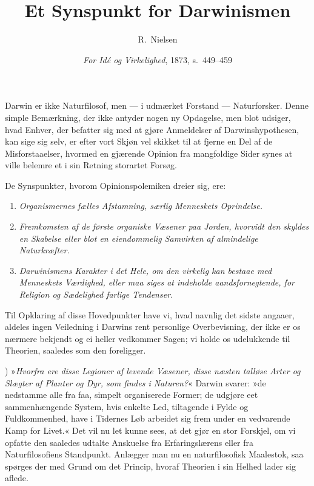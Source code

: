 \documentclass[12pt,a4paper]{article}
\title{\textbf{Et Synspunkt for Darwinismen}}
\author{R.\ Nielsen}
\date{\emph{For Idé og Virkelighed}, 1873, s.\ 449--459}
\newcommand{\apage}[1]{\marginnote{\footnotesize\textit{[#1]}}}
\begin{document}
\maketitle
\thispagestyle{fancy} \apage{449}

\bigskip

\noindent Darwin er ikke Naturfilosof, men --- i udmærket Forstand ---
Naturforsker. Denne simple Bemærkning, der ikke antyder nogen ny
Opdagelse, men blot udsiger, hvad Enhver, der befatter sig med at
gjøre Anmeldelser af Darwinshypothesen, kan sige sig selv, er efter
vort Skjøn vel skikket til at fjerne en Del af de Misforstaaelser,
hvormed en gjærende Opinion fra mangfoldige Sider synes at ville
belemre et i sin Retning storartet Forsøg.

De Synspunkter, hvorom Opinionspolemiken dreier sig, ere:

\begin{enumerate}
  \item \emph{Organismernes fælles Afstamning, særlig Menneskets Oprindelse.}
  \item \emph{Fremkomsten af de første organiske Væsener paa Jorden,
        hvorvidt den skyldes en Skabelse eller blot en eiendommelig
        Samvirken af almindelige Naturkræfter.}
  \item \emph{Darwinismens Karakter i det Hele, om den virkelig kan bestaae
        med Menneskets Værdighed, eller maa siges at indeholde
        \apage{450}aandsfornegtende, for Religion og Sædelighed farlige Tendenser.}
\end{enumerate}

\noindent Til Opklaring af disse Hovedpunkter have vi, hvad navnlig
det sidste angaaer, aldeles ingen Veiledning i Darwins rent personlige
Overbevisning, der ikke er os nærmere bekjendt og ei heller vedkommer
Sagen; vi holde os udelukkende til Theorien, saaledes som den
foreligger.


\medskip

) »\emph{Hvorfra ere disse Legioner af levende Væsener, disse næsten
talløse Arter og Slægter af Planter og Dyr, som findes i Naturen?}«
Darwin svarer: »de nedstamme alle fra faa, simpelt organiserede Former;
de udgjøre eet sammenhængende System, hvis enkelte Led, tiltagende i
Fylde og Fuldkommenhed, have i Tidernes Løb arbeidet sig frem under en
vedvarende Kamp for Livet.« Det vil nu let kunne sees, at det gjør en stor Forskjel, om vi opfatte
den saaledes udtalte Anskuelse fra Erfaringslærens eller fra
Naturfilosofiens Standpunkt. Anlægger man nu en naturfilosofisk
Maalestok, saa spørges der med Grund om det Princip, hvoraf Theorien i
sin Helhed lader sig aflede.
\end{document}
